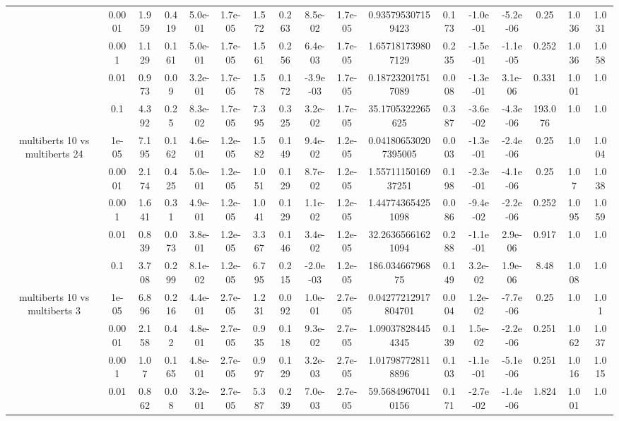\begin{tabular}{|c|c|c|c|c|c|c|c|c|c|c|c|c|c|c|c|c|}
 & 0.0001 & 1.959 & 0.419 & 5.0e-01 & 1.7e-05 & 1.572 & 0.263 & 8.5e-02 & 1.7e-05 & 0.935795307159423 & 0.173 & -1.0e-01 & -5.2e-06 & 0.25 & 1.036 & 1.031 \\
 & 0.001 & 1.129 & 0.161 & 5.0e-01 & 1.7e-05 & 1.561 & 0.256 & 6.4e-03 & 1.7e-05 & 1.657181739807129 & 0.235 & -1.5e-01 & -1.1e-05 & 0.252 & 1.036 & 1.058 \\
 & 0.01 & 0.973 & 0.09 & 3.2e-01 & 1.7e-05 & 1.578 & 0.172 & -3.9e-03 & 1.7e-05 & 0.187232017517089 & 0.008 & -1.3e-01 & 3.1e-06 & 0.331 & 1.001 & 1.0 \\
 & 0.1 & 4.392 & 0.25 & 8.3e-02 & 1.7e-05 & 7.395 & 0.325 & 3.2e-02 & 1.7e-05 & 35.1705322265625 & 0.387 & -3.6e-02 & -4.3e-06 & 193.076 & 1.0 & 1.0 \\
\hline
\multirow{5}{*}{multiberts 10 vs multiberts 24} & 1e-05 & 7.195 & 0.162 & 4.6e-01 & 1.2e-05 & 1.582 & 0.149 & 9.4e-02 & 1.2e-05 & 0.041806530207395005 & 0.003 & -1.3e-01 & -2.4e-06 & 0.25 & 1.0 & 1.004 \\
 & 0.0001 & 2.174 & 0.425 & 5.0e-01 & 1.2e-05 & 1.051 & 0.129 & 8.7e-02 & 1.2e-05 & 1.5571115016937251 & 0.198 & -2.3e-01 & -4.1e-06 & 0.25 & 1.07 & 1.038 \\
 & 0.001 & 1.641 & 0.31 & 4.9e-01 & 1.2e-05 & 1.041 & 0.129 & 1.1e-02 & 1.2e-05 & 1.447743654251098 & 0.086 & -9.4e-02 & -2.2e-06 & 0.252 & 1.095 & 1.059 \\
 & 0.01 & 0.839 & 0.073 & 3.8e-01 & 1.2e-05 & 3.367 & 0.146 & 3.4e-02 & 1.2e-05 & 32.26365661621094 & 0.288 & -1.1e-01 & 2.9e-06 & 0.917 & 1.0 & 1.0 \\
 & 0.1 & 3.708 & 0.299 & 8.1e-02 & 1.2e-05 & 6.795 & 0.215 & -2.0e-03 & 1.2e-05 & 186.03466796875 & 0.149 & 3.2e-02 & 1.9e-06 & 8.48 & 1.008 & 1.0 \\
\hline
\multirow{5}{*}{multiberts 10 vs multiberts 3} & 1e-05 & 6.896 & 0.216 & 4.4e-01 & 2.7e-05 & 1.231 & 0.092 & 1.0e-01 & 2.7e-05 & 0.04277212917804701 & 0.004 & 1.2e-02 & -7.7e-06 & 0.25 & 1.0 & 1.01 \\
 & 0.0001 & 2.158 & 0.42 & 4.8e-01 & 2.7e-05 & 0.935 & 0.118 & 9.3e-02 & 2.7e-05 & 1.090378284454345 & 0.139 & 1.5e-02 & -2.2e-06 & 0.251 & 1.062 & 1.037 \\
 & 0.001 & 1.07 & 0.165 & 4.8e-01 & 2.7e-05 & 0.997 & 0.129 & 3.2e-03 & 2.7e-05 & 1.017987728118896 & 0.103 & -1.1e-01 & -5.1e-06 & 0.251 & 1.016 & 1.015 \\
 & 0.01 & 0.862 & 0.08 & 3.2e-01 & 2.7e-05 & 5.387 & 0.239 & 7.0e-03 & 2.7e-05 & 59.56849670410156 & 0.171 & -2.7e-02 & -1.4e-06 & 1.824 & 1.001 & 1.0 \\

\end{tabular}
